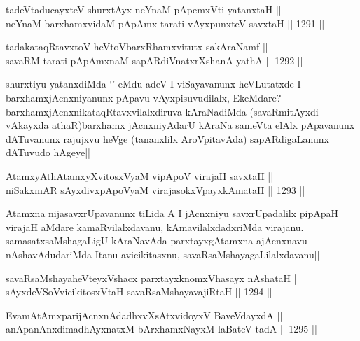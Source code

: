 
\begin{shl}
tadeVtaducayxteV shurxtAyx neYnaM pApemxVti yatanxtaH ||  \\
neYnaM barxhamxvidaM pApAmx tarati vAyxpunxteV savxtaH ||  1291 ||  
\end{shl}

\begin{shl}
tadakataqRtavxtoV heVtoVbarxRhamxvitutx sakAraNamf ||  \\
savaRM tarati pApAmxnaM sapARdiVnatxrXshanA yathA ||  1292 ||  
\end{shl}

\begin{artha}
shurxtiyu yatanxdiMda `\stext' eMdu adeV I viSayavanunx heVLutatxde I barxhamxjAcnxniyanunx pApavu vAyxpisuvudilalx, EkeMdare? barxhamxjAcnxnikataqRtavxvilalxdiruva kAraNadiMda (savaRmitAyxdi vAkayxda athaR)barxhamx jAcnxniyAdarU kAraNa sameVta elAlx pApavanunx dATuvanunx rajujxvu heVge (tananxlilx AroVpitavAda) sapARdigaLanunx dATuvudo hAgeye||
\end{artha}

\begin{shl}
AtamxyAthAtamxyXvitosxV\s yaM vipApoV virajaH savxtaH || \\
niSakxmAR sAyxdivxpApoV\s yaM virajasokxV\s payxkAmataH ||  1293 ||  
\end{shl}

\begin{artha}
Atamxna nijasavxrUpavanunx tiLida A I jAcnxniyu savxrUpadalilx pipApaH virajaH aMdare kamaRvilalxdavanu, kAmavilalxdadxriMda virajanu. samasatxsaMshagaLigU kAraNavAda parxtayxgAtamxna ajAcnxnavu nAshavAdudariMda Itanu avicikitasxnu, savaRsaMshayagaLilalxdavanu||
\end{artha}

\begin{shl}
savaRsaMshayaheVteyxVshacx parxtayxknomxVhasayx nAshataH || \\
sAyxdeVSoV\s vicikitosxV\s taH savaRsaMshayavajiRtaH ||  1294 ||  
\end{shl}


\begin{shl}
EvamAtAmxparijAcnxnAdadhxvXsAtxvidoyxV BaveVdayxdA || \\
anApanAnxdimadhAyxnatxM bArxhamxNayxM laBateV tadA ||  1295 ||  
\end{shl}

